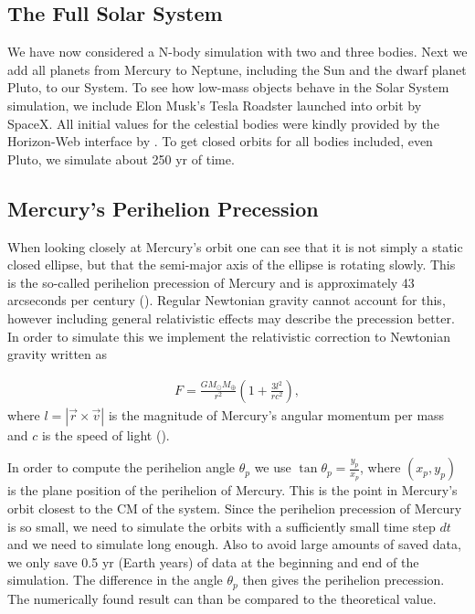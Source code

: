 \documentclass[twocolumn]{aastex62}
\begin{document}
\subsection{The Full Solar System} \label{subsec:solar_system}
We have now considered a N-body simulation with two and three bodies. Next we
add all planets from Mercury to Neptune, including the Sun and the dwarf planet
Pluto, to our System. To see how low-mass objects behave in the Solar System
simulation, we include Elon Musk's Tesla Roadster launched into orbit by
SpaceX. All initial values for the celestial bodies were kindly provided by the Horizon-Web interface by
\cite{nasa:2018}.
To get closed orbits for all bodies included, even Pluto, we simulate
about 250 yr of time.

\subsection{Mercury's Perihelion Precession}\label{sec:mercuryprecession}
When looking closely at Mercury's orbit one can see that it is not simply a
static closed ellipse, but that the semi-major axis of the ellipse is rotating
slowly. This is the so-called perihelion precession of Mercury and is approximately 43 arcseconds per century (\cite{jensen:2019}). Regular Newtonian gravity cannot account for
this, however including general relativistic effects may describe the
precession better. In order to simulate this we implement the
relativistic correction to Newtonian gravity written as 

\begin{align}\label{eq:relcorrection}
    F = \frac{G M_\odot M_\oplus}{r^2}\left(1 + \frac{3l^2}{r c^2}\right),
\end{align}
where $l = |\vec{r}\times \vec{v}|$ is the magnitude of Mercury's angular
momentum per mass and $c$ is the speed of light (\cite{jensen:2019}).

In order to compute the perihelion angle $\theta_p$ we use $\tan \theta_p =
\frac{y_p}{x_p}$, where $(x_p, y_p)$ is the plane position of the perihelion of
Mercury. This is the point in Mercury's orbit closest to the CM of the system.
Since the perihelion precession of Mercury is so small, we need to simulate the
orbits with a sufficiently small time step $dt$ and we need to simulate long
enough. Also to avoid large amounts of
saved data, we only save 0.5 yr (Earth years) of data at the beginning and end of the
simulation. The difference in the angle $\theta_p$ then gives the perihelion
precession. The numerically found result can than be compared to the theoretical
value.
\end{document}
